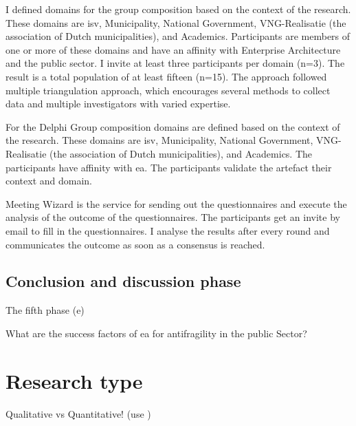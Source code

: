 I defined domains for the group composition based on the context of the research. These domains are \acrfull{isv}, Municipality, National Government, VNG-Realisatie (the association of Dutch municipalities), and Academics. Participants are members of one or more of these domains and have an affinity with Enterprise Architecture and the public sector. I invite at least three participants per domain (n=3). The result is a total population of at least fifteen (n=15). The approach followed \textcite{Denzin2017} multiple triangulation approach, which encourages several methods to collect data and multiple investigators with varied expertise.

For the Delphi Group composition domains are defined based on the context of the research. These domains are \acrfull{isv}, Municipality, National Government, VNG-Realisatie (the association of Dutch municipalities), and Academics. The participants have affinity with \acrshort{ea}. The participants validate the artefact their context and domain.

Meeting Wizard is the service for sending out the questionnaires and execute the analysis of the outcome of the questionnaires. The participants get an invite by email to fill in the questionnaires. I analyse the results after every round and communicates the outcome as soon as a consensus is reached.

\subsection{Conclusion and discussion phase}
\label{sub:conclusionanddiscussinophase}
The fifth phase (e)

What are the success factors of \acrlong{ea} for \gls{antifragility} in the public Sector?

\section{Research type}

\begin{remark}
	Qualitative vs Quantitative! (use \parencite{Recker2013})
\end{remark}


